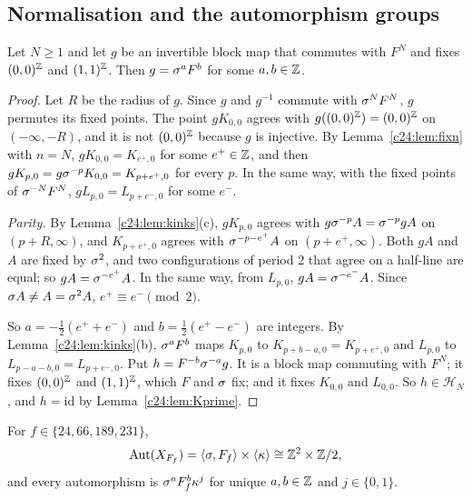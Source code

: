 \subsection{Normalisation and the automorphism groups}\label{c24:sec:end}

\begin{lemma}[normalisation]\label{c24:lem:norm}
Let $N\ge1$ and let $g$ be an invertible block map that commutes with $F^N$ and fixes $(0,0)^{\mathbb{Z}}$ and $(1,1)^{\mathbb{Z}}$. Then $g=\sigma^aF^b$ for some $a,b\in\mathbb{Z}$.
\end{lemma}

\begin{proof}
Let $R$ be the radius of $g$. Since $g$ and $g^{-1}$ commute with $\sigma^NF^N$, $g$ permutes its fixed points. The point $gK_{0,0}$ agrees with $g((0,0)^{\mathbb{Z}})=(0,0)^{\mathbb{Z}}$ on $(-\infty,-R)$, and it is not $(0,0)^{\mathbb{Z}}$ because $g$ is injective. By Lemma~\ref{c24:lem:fixn} with $n=N$, $gK_{0,0}=K_{e^+,0}$ for some $e^+\in\mathbb{Z}$, and then $gK_{p,0}=g\sigma^{-p}K_{0,0}=K_{p+e^+,0}$ for every $p$. In the same way, with the fixed points of $\sigma^{-N}F^N$, $gL_{p,0}=L_{p+e^-,0}$ for some $e^-$.

\emph{Parity.} By Lemma~\ref{c24:lem:kinks}(c), $gK_{p,0}$ agrees with $g\sigma^{-p}A=\sigma^{-p}gA$ on $(p+R,\infty)$, and $K_{p+e^+,0}$ agrees with $\sigma^{-p-e^+}A$ on $(p+e^+,\infty)$. Both $gA$ and $A$ are fixed by $\sigma^2$, and two configurations of period $2$ that agree on a half-line are equal; so $gA=\sigma^{-e^+}A$. In the same way, from $L_{p,0}$, $gA=\sigma^{-e^-}A$. Since $\sigma A\ne A=\sigma^2A$, $e^+\equiv e^-\pmod2$.

So $a=-\frac12(e^++e^-)$ and $b=\frac12(e^+-e^-)$ are integers. By Lemma~\ref{c24:lem:kinks}(b), $\sigma^aF^b$ maps $K_{p,0}$ to $K_{p+b-a,0}=K_{p+e^+,0}$ and $L_{p,0}$ to $L_{p-a-b,0}=L_{p+e^-,0}$. Put $h=F^{-b}\sigma^{-a}g$. It is a block map commuting with $F^N$; it fixes $(0,0)^{\mathbb{Z}}$ and $(1,1)^{\mathbb{Z}}$, which $F$ and $\sigma$ fix; and it fixes $K_{0,0}$ and $L_{0,0}$. So $h\in\mathcal H_N$, and $h=\mathrm{id}$ by Lemma~\ref{c24:lem:Kprime}.
\end{proof}

\begin{theorem}\label{c24:thm:main}
For $f\in\{24,66,189,231\}$,
\[
\operatorname{Aut}(X_{F_f})=\langle\sigma,F_f\rangle\times\langle\kappa\rangle\cong\mathbb{Z}^2\times\mathbb{Z}/2,
\]
and every automorphism is $\sigma^aF_f^b\kappa^j$ for unique $a,b\in\mathbb{Z}$ and $j\in\{0,1\}$.
\end{theorem}

